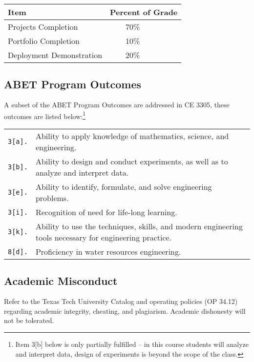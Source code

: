 \documentclass[12pt]{article}
\begin{document}
\begin{table}[h!]
   \centering
   \begin{tabular}{l l}
Item & Percent of Grade \\
\hline
\hline
Projects  Completion   & ~~~~70\% \\
Portfolio Completion      &  ~~~~10\% \\
Deployment Demonstration  & ~~~~20\% \\
\hline
\end{tabular}
\end{table}
\subsection*{ABET Program Outcomes}
A subset of the ABET Program Outcomes are addressed in CE 3305, these outcomes are listed below:\footnote{Item 3[b] below is only partially fulfilled -- in this course students will analyze and interpret data, design of experiments is beyond the scope of the class.}

\begin{tabular}{p{0.5in}p{5.5in}}
\texttt{3[a].}  & Ability to apply knowledge of mathematics, science, and engineering.\\
\texttt{3[b].}  & Ability to design and conduct experiments, as well as to analyze and interpret data.\\
\texttt{3[e].}  & Ability to identify, formulate, and solve engineering problems.\\
\texttt{3[i].}   & Recognition of need for life-long learning.\\
\texttt{3[k].}  & Ability to use the techniques, skills, and modern engineering tools necessary for engineering practice.\\
\texttt{8[d].}  & Proficiency in water resources engineering.\\
\end{tabular}
\subsection*{Academic Misconduct}
Refer to the Texas Tech University Catalog and operating policies (OP 34.12) regarding
academic integrity, cheating, and plagiarism. Academic dishonesty will not be tolerated.
\end{document}
